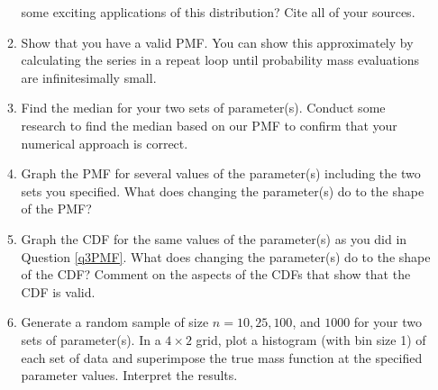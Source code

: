\documentclass{article}\usepackage[]{graphicx}\usepackage[]{color}
\begin{document}
\begin{enumerate}
\begin{enumerate}
  some exciting applications of this distribution? Cite all of your sources.
	\item Show that you have a valid PMF. You can show this approximately by 
	calculating the series in a repeat loop until probability mass evaluations are 
	infinitesimally small.
	\item Find the median for your two sets of parameter(s). Conduct some research 
	to find the median based on our PMF to confirm that your numerical approach is
	correct. 
	\item \label{q3PMF} Graph the PMF for several values of the parameter(s) 
	including the two sets you specified. What does changing the parameter(s) do 
	to the shape of the PMF?
	 \item Graph the CDF for the same values of the parameter(s) as you did in 
	 Question \ref{q3PMF}. What does changing the parameter(s) do to the shape of 
	 the CDF? Comment on the aspects of the CDFs that show that the CDF is valid.
  \item Generate a random sample of size $n=10, 25, 100$, and $1000$ for your 
  two sets of parameter(s). In a $4 \times 2$ grid, plot a histogram (with bin 
  size 1) of each set of data and superimpose the true mass function at the 
  specified parameter values. Interpret the results.
	\end{enumerate}

\end{enumerate}
\end{document}
